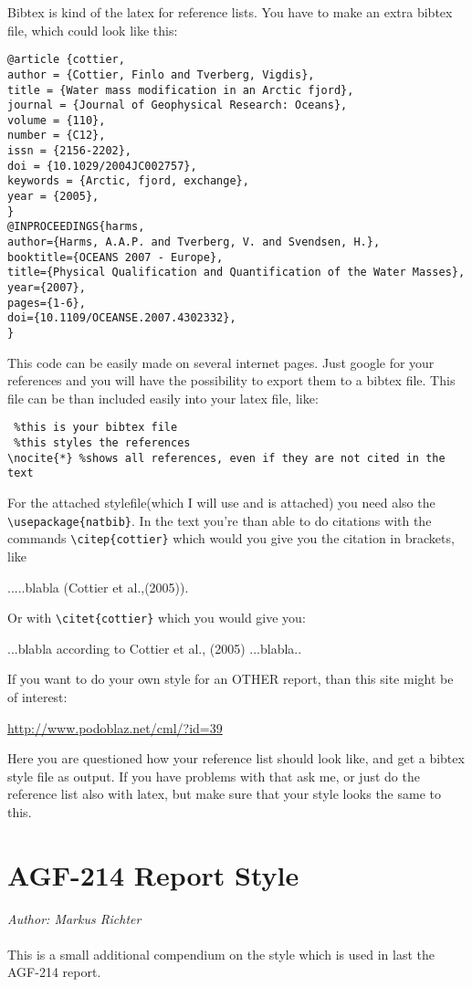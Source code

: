 \documentclass[12pt,a4paper,notitlepage]{scrreprt}
\begin{document}
Bibtex is kind of the latex for reference lists. You have to make an extra bibtex file, which could look like this:
\begin{verbatim}
@article {cottier,
author = {Cottier, Finlo and Tverberg, Vigdis},
title = {Water mass modification in an Arctic fjord},
journal = {Journal of Geophysical Research: Oceans},
volume = {110},
number = {C12},
issn = {2156-2202},
doi = {10.1029/2004JC002757},
keywords = {Arctic, fjord, exchange},
year = {2005},
}
@INPROCEEDINGS{harms,
author={Harms, A.A.P. and Tverberg, V. and Svendsen, H.},
booktitle={OCEANS 2007 - Europe},
title={Physical Qualification and Quantification of the Water Masses},
year={2007},
pages={1-6},
doi={10.1109/OCEANSE.2007.4302332},
}
\end{verbatim}
This code can be easily made on several internet pages. Just google for your references and you will have the possibility to export them to a bibtex file.
This file can be than included easily into your latex file, like:
\begin{verbatim}
 %this is your bibtex file
 %this styles the references
\nocite{*} %shows all references, even if they are not cited in the text
\end{verbatim}
For the attached stylefile(which I will use and is attached) you need also the \verb#\usepackage{natbib}#.
In the text you're than able to do citations with the commands \verb#\citep{cottier}# which would you give you the citation in brackets, like
\begin{center}
.....blabla (Cottier et al.,(2005)).
\end{center}
Or with \verb#\citet{cottier}# which you would give you:
\begin{center}
...blabla according to Cottier et al., (2005) ...blabla..
\end{center}
If you want to do your own style for an OTHER report, than this site might be of interest:
\begin{center}
\url{http://www.podoblaz.net/cml/?id=39}
\end{center}
Here you are questioned how your reference list should look like, and get a bibtex style file as output. If you have problems with that ask me, or just do the reference list also with latex, but make sure that your style looks the same to this.

\chapter{AGF-214 Report Style}
\textit{Author: Markus Richter}\\\ \\
This is a small additional compendium on the style which is used in last the AGF-214 report.
\end{document}
